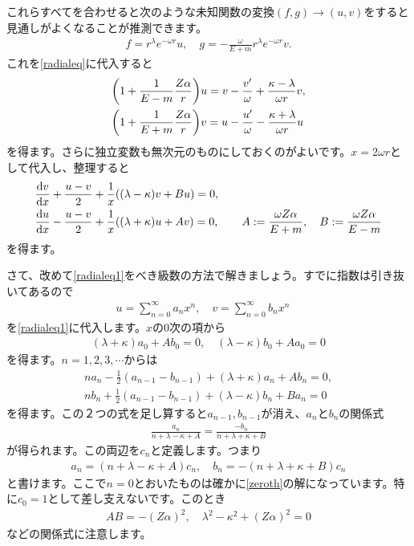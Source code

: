 \documentclass[report,paper=a4, fontsize=12pt, line_length=16cm, number_of_lines=33,dvipdfmx]{jlreq}
\numberwithin{equation}{chapter}
\begin{document}
これらすべてを合わせると次のような未知関数の変換$(f,g)\to(u,v)$をすると見通しがよくなることが推測できます。
\begin{align}
  f=r^{\lambda}e^{-\omega r}u,\quad
  g=-\frac{\omega}{E+m}r^{\lambda}e^{-\omega r}v.
  \label{defuv}
\end{align}
これを\eqref{radialeq}に代入すると
\begin{align}
  &\qty(1+\frac{1}{E-m}\frac{Z\alpha}{r})u=v-\frac{v'}{\omega}+\frac{\kappa-\lambda}{\omega r}v,\\
  &\qty(1+\frac{1}{E+m}\frac{Z\alpha}{r})v=u-\frac{u'}{\omega}-\frac{\kappa+\lambda}{\omega r}u
\end{align}
を得ます。さらに独立変数も無次元のものにしておくのがよいです。$x=2\omega r$として代入し、整理すると
\begin{align}
  &\dv{v}{x}+\frac{u-v}{2}+\frac{1}{x}\qty((\lambda-\kappa)v+Bu)=0,\\
  &\dv{u}{x}-\frac{u-v}{2}+\frac{1}{x}\qty((\lambda+\kappa)u+Av)=0,\qquad
  A:=\frac{\omega Z\alpha}{E+m},\quad B:=\frac{\omega Z\alpha}{E-m}
  \label{radialeq1}
\end{align}
を得ます。

さて、改めて\eqref{radialeq1}をべき級数の方法で解きましょう。すでに指数は引き抜いてあるので
\begin{align}
  u=\sum_{n=0}^{\infty}a_{n}x^n,\quad
  v=\sum_{n=0}^{\infty}b_{n}x^n\quad
\end{align}
を\eqref{radialeq1}に代入します。$x$の$0$次の項から
\begin{align}
  (\lambda+\kappa)a_0+Ab_0=0,\quad
  (\lambda-\kappa)b_0+Aa_0=0\label{zeroth}
\end{align}
を得ます。$n=1,2,3,\cdots$からは
\begin{align}
  na_n-\frac12(a_{n-1}-b_{n-1})+(\lambda+\kappa)a_n + A b_n=0,\\
  nb_n+\frac12(a_{n-1}-b_{n-1})+(\lambda-\kappa)b_n + B a_n=0
  \label{higher}
\end{align}
を得ます。この２つの式を足し算すると$a_{n-1},b_{n-1}$が消え、$a_n$と$b_n$の関係式
\begin{align}
  \frac{a_n}{n+\lambda-\kappa+A}=\frac{-b_n}{n+\lambda+\kappa+B}
\end{align}
が得られます。この両辺を$c_n$と定義します。つまり
\begin{align}
  a_{n}=(n+\lambda-\kappa+A)c_n,\quad
  b_{n}=-(n+\lambda+\kappa+B)c_n
  \label{cn}
\end{align}
と書けます。ここで$n=0$とおいたものは確かに\eqref{zeroth}の解になっています。特に$c_0=1$として差し支えないです。このとき
\begin{align}
  AB=-(Z\alpha)^2,\quad \lambda^2-\kappa^2+(Z\alpha)^2=0
\end{align}
などの関係式に注意します。
\end{document}
